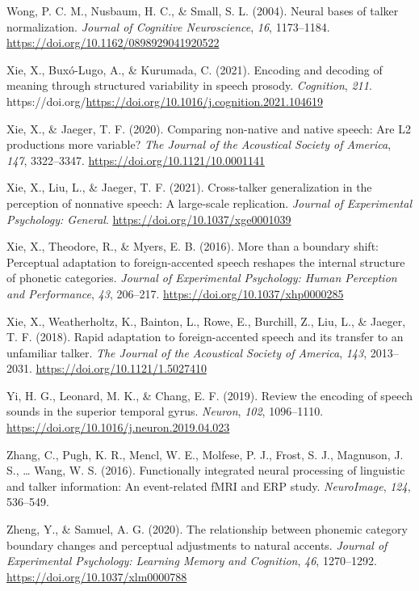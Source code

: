 \documentclass[
  11pt,
  english,
  man,floatsintext]{apa6}
\newlength{\cslhangindent}
\newlength{\cslentryspacingunit} %
\newenvironment{CSLReferences}[2] %
 {%
  \setlength{\parindent}{0pt}
  \ifodd #1
  \let\oldpar\par
  \def\par{\hangindent=\cslhangindent\oldpar}
  \fi
  \setlength{\parskip}{#2\cslentryspacingunit}
 }%
 {}
\begin{document}
\begin{CSLReferences}{1}{0}
\leavevmode{}%
Wong, P. C. M., Nusbaum, H. C., \& Small, S. L. (2004). Neural bases of talker normalization. \emph{Journal of Cognitive Neuroscience}, \emph{16}, 1173--1184. \url{https://doi.org/10.1162/0898929041920522}

\leavevmode{}%
Xie, X., Buxó-Lugo, A., \& Kurumada, C. (2021). Encoding and decoding of meaning through structured variability in speech prosody. \emph{Cognition}, \emph{211}. https://doi.org/\url{https://doi.org/10.1016/j.cognition.2021.104619}

\leavevmode{}%
Xie, X., \& Jaeger, T. F. (2020). Comparing non-native and native speech: Are L2 productions more variable? \emph{The Journal of the Acoustical Society of America}, \emph{147}, 3322--3347. \url{https://doi.org/10.1121/10.0001141}

\leavevmode{}%
Xie, X., Liu, L., \& Jaeger, T. F. (2021). Cross-talker generalization in the perception of nonnative speech: A large-scale replication. \emph{Journal of Experimental Psychology: General}. \url{https://doi.org/10.1037/xge0001039}

\leavevmode{}%
Xie, X., Theodore, R., \& Myers, E. B. (2016). More than a boundary shift: Perceptual adaptation to foreign-accented speech reshapes the internal structure of phonetic categories. \emph{Journal of Experimental Psychology: Human Perception and Performance}, \emph{43}, 206--217. \url{https://doi.org/10.1037/xhp0000285}

\leavevmode{}%
Xie, X., Weatherholtz, K., Bainton, L., Rowe, E., Burchill, Z., Liu, L., \& Jaeger, T. F. (2018). Rapid adaptation to foreign-accented speech and its transfer to an unfamiliar talker. \emph{The Journal of the Acoustical Society of America}, \emph{143}, 2013--2031. \url{https://doi.org/10.1121/1.5027410}

\leavevmode{}%
Yi, H. G., Leonard, M. K., \& Chang, E. F. (2019). Review the encoding of speech sounds in the superior temporal gyrus. \emph{Neuron}, \emph{102}, 1096--1110. \url{https://doi.org/10.1016/j.neuron.2019.04.023}

\leavevmode{}%
Zhang, C., Pugh, K. R., Mencl, W. E., Molfese, P. J., Frost, S. J., Magnuson, J. S., \ldots{} Wang, W. S. (2016). Functionally integrated neural processing of linguistic and talker information: An event-related fMRI and ERP study. \emph{NeuroImage}, \emph{124}, 536--549.

\leavevmode{}%
Zheng, Y., \& Samuel, A. G. (2020). The relationship between phonemic category boundary changes and perceptual adjustments to natural accents. \emph{Journal of Experimental Psychology: Learning Memory and Cognition}, \emph{46}, 1270--1292. \url{https://doi.org/10.1037/xlm0000788}

\end{CSLReferences}

\endgroup
\end{document}
